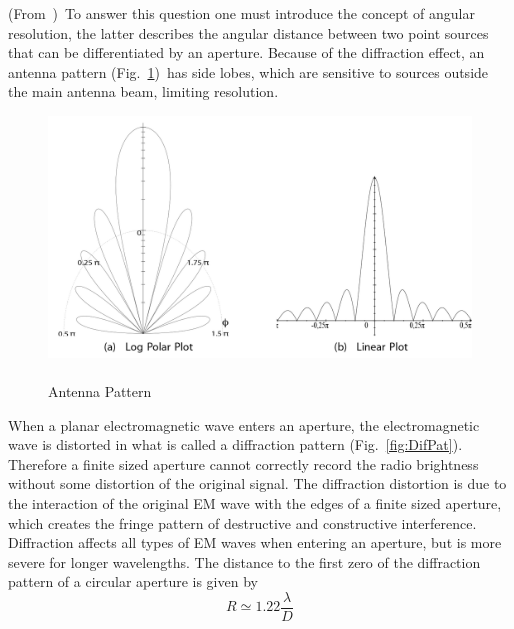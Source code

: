 (From~\citet[~Appendix~B.1]{woods2010accelerating})~To answer this question one must introduce the concept of angular resolution, the latter describes the angular distance between two point sources that can be differentiated by an aperture. Because of the diffraction effect, an antenna pattern (Fig.~\ref{fig:AntPat})~has side lobes,
which are sensitive to sources outside the main antenna beam, limiting resolution. 
\begin{figure}[htbp]

  \begin{center}
    \includegraphics[scale= 1]{Figures/AntennaPattern}
  \end{center}
  
 	\caption[Antenna Pattern]{\\Antenna Pattern~\citep[Appendix~B.1,~Fig.~B.2]{woods2010accelerating}}
	\label{fig:AntPat}
\end{figure}
When a planar electromagnetic wave enters an aperture, the electromagnetic wave is distorted in what is called a diffraction pattern (Fig.~\ref{fig:DifPat}). Therefore a finite sized aperture cannot correctly record the radio brightness without some distortion of the original signal. The diffraction distortion is due to the interaction of the original EM wave with the edges of a finite sized aperture, which creates the fringe pattern of destructive and constructive interference. Diffraction affects all types of EM waves when entering an aperture, but is more severe for longer wavelengths. The distance to the first zero of the diffraction pattern of a circular aperture is given by
\begin{equation}
\label{eq:rayleigh}
R \simeq 1.22\frac{\lambda}{D} 
\end{equation}
